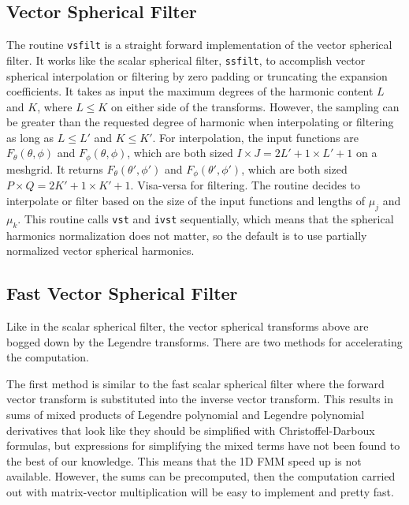 {\footnotesize
{}
}


\subsection{Vector Spherical Filter}

The routine \texttt{vsfilt} is a straight forward implementation of the vector spherical filter.  It works like the scalar spherical filter, \texttt{ssfilt}, to accomplish vector spherical interpolation or filtering  by zero padding or truncating the expansion coefficients. It takes as input the maximum degrees of the harmonic content $L$ and $K$, where $L \le K$ on either side of the transforms. However, the sampling can be greater than the requested degree of harmonic when interpolating or filtering as long as $L\le L'$ and $K\le K'$.  For interpolation, the input functions are $F_{\theta}(\theta,\phi)$ and $F_{\phi}(\theta,\phi)$, which are both sized $I \times J = 2L'+1 \times L' + 1$ on a meshgrid. It returns $F_{\theta}(\theta',\phi')$ and $F_{\phi}(\theta',\phi')$, which are both sized $P \times Q = 2K'+1 \times K'+1$. Visa-versa for filtering. The routine decides to interpolate or filter based on the size of the input functions and lengths of $\mu_j$ and $\mu_k$. This routine calls \texttt{vst} and \texttt{ivst} sequentially, which means that the spherical harmonics normalization does not matter, so the default is to use partially normalized vector spherical harmonics. 

{\footnotesize
{}
}


\subsection{Fast Vector Spherical Filter}

Like in the scalar spherical filter, the vector spherical transforms above are bogged down by the Legendre transforms.  There are two methods for accelerating the computation.  

The first method is similar to the fast scalar spherical filter where the forward vector transform is substituted into the inverse vector transform. This results in sums of mixed products of Legendre polynomial and Legendre polynomial derivatives that look like they should be simplified with Christoffel-Darboux formulas, but expressions for simplifying the mixed terms have not been found to the best of our knowledge. This means that the 1D FMM speed up is not available. However, the sums can be precomputed, then the computation carried out with matrix-vector multiplication will be easy to implement and pretty fast. 

